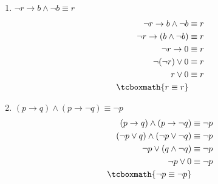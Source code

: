 \documentclass[10pt,letterpaper]{article}
\begin{document}
\begin{enumerate}
        \begin{enumerate}
            \item $\neg r \rightarrow b \land \neg b \equiv r$
                \begin{equation} \begin{split} \begin{aligned}
                    \neg r \rightarrow b \land \neg b &\equiv r \\
                    \neg r \rightarrow (b \land \neg b) &\equiv r \\
                    \neg r \rightarrow 0 &\equiv r \\
                    \neg (\neg r) \lor 0 &\equiv r \\
                    r \lor 0 &\equiv r \\
                    \tcboxmath{r \equiv r} \\
                \end{aligned} \end{split} \end{equation}

            \item $(p \rightarrow q) \land (p \rightarrow \neg q) \equiv \neg p$
                \begin{equation} \begin{split} \begin{aligned}
                    (p \rightarrow q) \land (p \rightarrow \neg q) &\equiv \neg p \\
                    (\neg p \lor q) \land (\neg p \lor \neg q) &\equiv \neg p \\
                    \neg p \lor (q \land \neg q) &\equiv \neg p \\
                    \neg p \lor 0 &\equiv \neg p \\
                    \tcboxmath{\neg p \equiv \neg p} \\
                \end{aligned} \end{split} \end{equation}
        \end{enumerate}
\end{enumerate}
\end{document}
